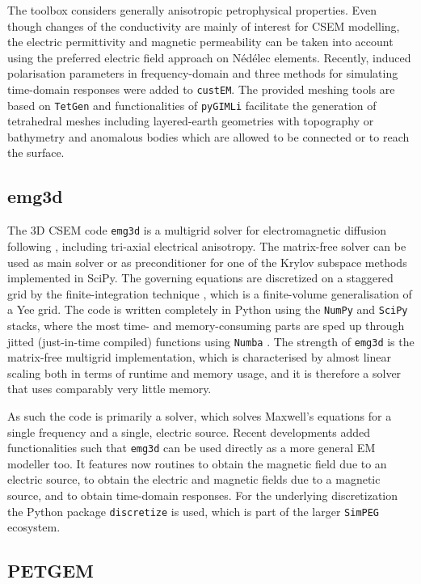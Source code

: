 \documentclass[
    paper,
  ]{geophysics}
\newcommand{\emg}[2]{\texttt{emg#1#2}\xspace}
\newcommand{\simpeg}{\texttt{SimPEG}\xspace}
\newcommand{\discretize}{\texttt{discretize}\xspace}
\newcommand{\custem}{\texttt{custEM}\xspace}
\begin{document}
The toolbox considers generally anisotropic petrophysical properties. Even though changes of the conductivity are mainly of interest for CSEM modelling, the electric permittivity and magnetic permeability can be taken into account using the preferred electric field approach on Nédélec elements. Recently, induced polarisation parameters in frequency-domain and three methods for simulating time-domain responses were added to \custem. The provided meshing tools are based on \texttt{TetGen} \citep{TOM.15.Si} and functionalities of \texttt{pyGIMLi} facilitate the generation of tetrahedral meshes including layered-earth geometries with topography or bathymetry and anomalous bodies which are allowed to be connected or to reach the surface.

\subsection{emg3d}

The 3D CSEM code \emg3d is a multigrid solver \citep{CMMP.64.Fedorenko} for electromagnetic diffusion following \cite{GP.06.Mulder}, including tri-axial electrical anisotropy. The matrix-free solver can be used as main solver or as preconditioner for one of the Krylov subspace methods implemented in SciPy. The governing equations are discretized on a staggered grid by the finite-integration technique \citep{AEU.77.Weiland}, which is a finite-volume generalisation of a Yee grid. The code is written completely in Python using the \texttt{NumPy} and \texttt{SciPy} stacks, where the most time- and memory-consuming parts are sped up through jitted (just-in-time compiled) functions using \texttt{Numba} \citep{LLVM.15.Lam}. The strength of \emg3d is the matrix-free multigrid implementation, which is characterised by almost linear scaling both in terms of runtime and memory usage, and it is therefore a solver that uses comparably very little memory.

As such the code is primarily a solver, which solves Maxwell's equations for a single frequency and a single, electric source. Recent developments added functionalities such that \emg3d can be used directly as a more general EM modeller too. It features now routines to obtain the magnetic field due to an electric source, to obtain the electric and magnetic fields due to a magnetic source, and to obtain time-domain responses. For the underlying discretization the Python package \discretize is used, which is part of the larger \simpeg ecosystem.

\subsection{PETGEM}
\end{document}
